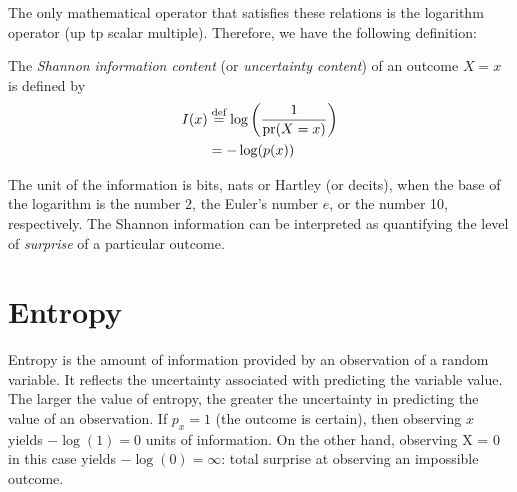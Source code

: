\documentclass[a4paper, 12pt]{book} %
\begin{document}
The only mathematical operator that satisfies these relations is the logarithm operator (up tp scalar multiple). Therefore, we have the following definition:
\begin{definition}
    The \emph{Shannon} \emph{information content} (or \emph{uncertainty content}) of an outcome $X = x$ is defined by
    \begin{align}
    I(x) &\overset{\text{def}}{=} \log\left(  \frac{1}{\operatorname{pr}(X = x)} \right) \\
    &= -\log(p(x))
    \end{align}
\end{definition}
The unit of the information is bits, nats or Hartley (or decits), when the base of the logarithm is the number $2$, the Euler's number $e$, or the number 10, respectively. The Shannon information can be interpreted as quantifying the level of \emph{surprise} of a particular outcome.



\section{Entropy}

Entropy is the amount of information provided by an observation of a random variable. It reflects the uncertainty associated with predicting the variable value. The larger the value of entropy, the greater the uncertainty in predicting the value of an observation. If $p_x = 1$ (the outcome is certain), then observing $x$ yields $-\log(1) = 0$ units of information. On the other hand, observing X = 0 in this case yields $-\log(0) = \infty$: total surprise at observing an impossible outcome.
\end{document}
